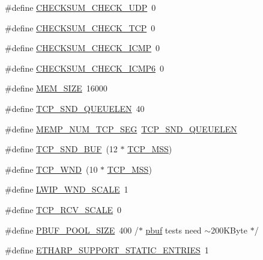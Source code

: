 \begin{DoxyCompactItemize}
\item 
\#define \hyperlink{openmote-cc2538_2lwip_2test_2fuzz_2lwipopts_8h_a6747f7b72abe544fd4dc184cc7fcad37}{C\+H\+E\+C\+K\+S\+U\+M\+\_\+\+C\+H\+E\+C\+K\+\_\+\+U\+DP}~0
\item 
\#define \hyperlink{openmote-cc2538_2lwip_2test_2fuzz_2lwipopts_8h_ab676cc29571b7ffda12336482ad97699}{C\+H\+E\+C\+K\+S\+U\+M\+\_\+\+C\+H\+E\+C\+K\+\_\+\+T\+CP}~0
\item 
\#define \hyperlink{openmote-cc2538_2lwip_2test_2fuzz_2lwipopts_8h_a79807171be8c20b69a5cd8de83566d25}{C\+H\+E\+C\+K\+S\+U\+M\+\_\+\+C\+H\+E\+C\+K\+\_\+\+I\+C\+MP}~0
\item 
\#define \hyperlink{openmote-cc2538_2lwip_2test_2fuzz_2lwipopts_8h_af466a10b093489910a773fd1cec74c2d}{C\+H\+E\+C\+K\+S\+U\+M\+\_\+\+C\+H\+E\+C\+K\+\_\+\+I\+C\+M\+P6}~0
\item 
\#define \hyperlink{openmote-cc2538_2lwip_2test_2fuzz_2lwipopts_8h_a2dcf8c45f945dd0c4301a94700f2112c}{M\+E\+M\+\_\+\+S\+I\+ZE}~16000
\item 
\#define \hyperlink{openmote-cc2538_2lwip_2test_2fuzz_2lwipopts_8h_a9beaa47832ead4180981bfbf71074904}{T\+C\+P\+\_\+\+S\+N\+D\+\_\+\+Q\+U\+E\+U\+E\+L\+EN}~40
\item 
\#define \hyperlink{openmote-cc2538_2lwip_2test_2fuzz_2lwipopts_8h_aa35fb3a1a76661e3ffb9722a57092de3}{M\+E\+M\+P\+\_\+\+N\+U\+M\+\_\+\+T\+C\+P\+\_\+\+S\+EG}~\hyperlink{openmote-cc2538_2lwip_2test_2unit_2lwipopts_8h_a9beaa47832ead4180981bfbf71074904}{T\+C\+P\+\_\+\+S\+N\+D\+\_\+\+Q\+U\+E\+U\+E\+L\+EN}
\item 
\#define \hyperlink{openmote-cc2538_2lwip_2test_2fuzz_2lwipopts_8h_a871d111968d8c6c7880ff36b93c5c4dd}{T\+C\+P\+\_\+\+S\+N\+D\+\_\+\+B\+UF}~(12 $\ast$ \hyperlink{group__lwip__opts__tcp_gaf1ab7bb27860aa3677c387a2f3ba317b}{T\+C\+P\+\_\+\+M\+SS})
\item 
\#define \hyperlink{openmote-cc2538_2lwip_2test_2fuzz_2lwipopts_8h_a7f535a6efb5cdf86c3210e35ece1d6a7}{T\+C\+P\+\_\+\+W\+ND}~(10 $\ast$ \hyperlink{group__lwip__opts__tcp_gaf1ab7bb27860aa3677c387a2f3ba317b}{T\+C\+P\+\_\+\+M\+SS})
\item 
\#define \hyperlink{openmote-cc2538_2lwip_2test_2fuzz_2lwipopts_8h_a88dbbfeeeb41b129fdc8235fc08bb530}{L\+W\+I\+P\+\_\+\+W\+N\+D\+\_\+\+S\+C\+A\+LE}~1
\item 
\#define \hyperlink{openmote-cc2538_2lwip_2test_2fuzz_2lwipopts_8h_a768765a2c678fefeca6c89aae0cf629f}{T\+C\+P\+\_\+\+R\+C\+V\+\_\+\+S\+C\+A\+LE}~0
\item 
\#define \hyperlink{openmote-cc2538_2lwip_2test_2fuzz_2lwipopts_8h_a50eaadc4cad0716410332691e382c38a}{P\+B\+U\+F\+\_\+\+P\+O\+O\+L\+\_\+\+S\+I\+ZE}~400 /$\ast$ \hyperlink{structpbuf}{pbuf} tests need $\sim$200\+K\+Byte $\ast$/
\item 
\#define \hyperlink{openmote-cc2538_2lwip_2test_2fuzz_2lwipopts_8h_a4675829464156f3d665f4de171c212d7}{E\+T\+H\+A\+R\+P\+\_\+\+S\+U\+P\+P\+O\+R\+T\+\_\+\+S\+T\+A\+T\+I\+C\+\_\+\+E\+N\+T\+R\+I\+ES}~1
\end{DoxyCompactItemize}


